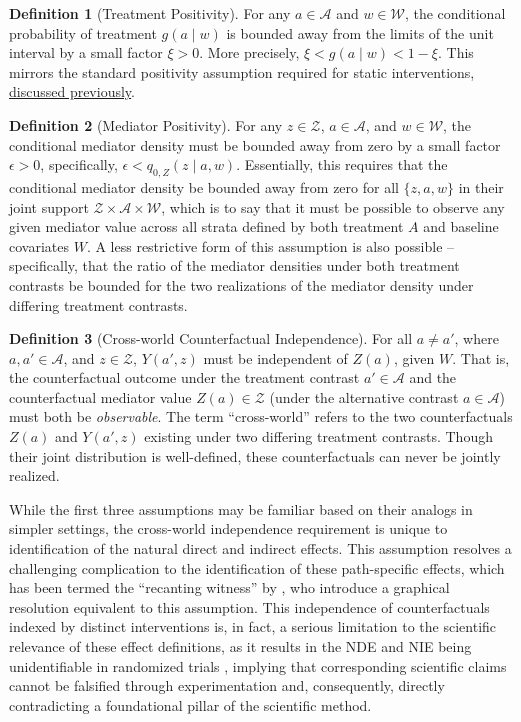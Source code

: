 \documentclass[
  12pt, krantz2,
]{krantz}
\newcommand{\1}{\mathbbm{1}}
\theoremstyle{definition}
\newtheorem{definition}{Definition}[chapter]
\theoremstyle{definition}
\theoremstyle{definition}
\theoremstyle{definition}
\theoremstyle{remark}
\begin{document}
\begin{definition}[Treatment Positivity]
For any \(a \in \mathcal{A}\) and \(w \in \mathcal{W}\), the conditional probability
of treatment \(g(a \mid w)\) is bounded away from the limits of the unit interval
by a small factor \(\xi > 0\). More precisely, \(\xi < g(a \mid w) < 1 - \xi\). This
mirrors the standard positivity assumption required for static interventions,
\protect\hyperlink{tmle3}{discussed previously}.
\end{definition}

\begin{definition}[Mediator Positivity]
For any \(z \in \mathcal{Z}\), \(a \in \mathcal{A}\), and \(w \in \mathcal{W}\), the
conditional mediator density must be bounded away from zero by a small factor
\(\epsilon > 0\), specifically, \(\epsilon < q_{0,Z}(z \mid a, w)\). Essentially,
this requires that the conditional mediator density be bounded away from zero
for all \(\{z, a, w\}\) in their joint support \(\mathcal{Z} \times \mathcal{A} \times \mathcal{W}\), which is to say that it must be possible to observe any
given mediator value across all strata defined by both treatment \(A\) and
baseline covariates \(W\). A less restrictive form of this assumption is also
possible -- specifically, that the ratio of the mediator densities under both
treatment contrasts be bounded for the two realizations of the mediator density
under differing treatment contrasts.
\end{definition}

\begin{definition}[Cross-world Counterfactual Independence]
For all \(a \neq a'\), where \(a, a' \in \mathcal{A}\), and \(z \in \mathcal{Z}\),
\(Y(a', z)\) must be independent of \(Z(a)\), given \(W\). That is, the counterfactual
outcome under the treatment contrast \(a' \in \mathcal{A}\) and the counterfactual
mediator value \(Z(a) \in \mathcal{Z}\) (under the alternative contrast \(a \in \mathcal{A}\)) must both be \emph{observable}. The term ``cross-world'' refers to the two
counterfactuals \(Z(a)\) and \(Y(a', z)\) existing under two differing treatment
contrasts. Though their joint distribution is well-defined, these
counterfactuals can never be jointly realized.
\end{definition}

While the first three assumptions may be familiar based on their analogs in
simpler settings, the cross-world independence requirement is unique to
identification of the natural direct and indirect effects. This assumption
resolves a challenging complication to the identification of these path-specific
effects, which has been termed the ``recanting witness'' by
\citet{avin2005identifiability}, who introduce a graphical resolution equivalent to
this assumption. This independence of counterfactuals indexed by distinct
interventions is, in fact, a serious limitation to the scientific relevance of
these effect definitions, as it results in the NDE and NIE being unidentifiable
in randomized trials \citep{robins2010alternative}, implying that corresponding
scientific claims cannot be falsified through experimentation \citep{popper1934logic, dawid2000causal} and, consequently, directly contradicting a foundational
pillar of the scientific method.
\end{document}
